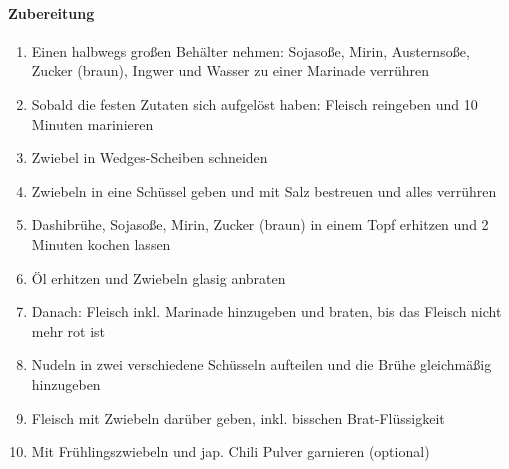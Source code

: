 \paragraph{Zubereitung}
\begin{enumerate}[noitemsep]
	\item Einen halbwegs großen Behälter nehmen: Sojasoße, Mirin, Austernsoße, Zucker (braun), Ingwer und Wasser zu einer Marinade verrühren
	\item Sobald die festen Zutaten sich aufgelöst haben: Fleisch reingeben und 10 Minuten marinieren
	\item Zwiebel in Wedges-Scheiben schneiden 
	\item Zwiebeln in eine Schüssel geben und mit Salz bestreuen und alles verrühren
	\item Dashibrühe, Sojasoße, Mirin, Zucker (braun) in einem Topf erhitzen und 2 Minuten kochen lassen
	\item Öl erhitzen und Zwiebeln glasig anbraten
	\item Danach: Fleisch inkl. Marinade hinzugeben und braten, bis das Fleisch nicht mehr rot ist
	\item Nudeln in zwei verschiedene Schüsseln aufteilen und die Brühe gleichmäßig hinzugeben
	\item Fleisch mit Zwiebeln darüber geben, inkl. bisschen Brat-Flüssigkeit
	\item Mit Frühlingszwiebeln und jap. Chili Pulver garnieren (optional)
\end{enumerate}
